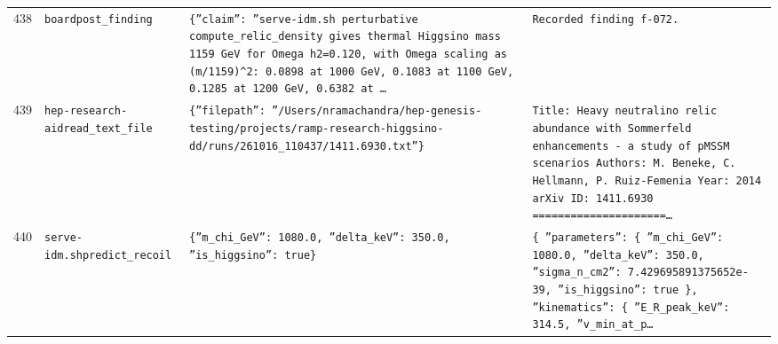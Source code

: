 \documentclass[11pt,a4paper]{article}
\begin{document}
\begin{longtable}{@{}p{}p{}p{}p{}@{}}
438 & \texttt{board}\newline\texttt{post\_\allowbreak{}finding} & \texttt{\{''claim'':\allowbreak{} ''serve-idm.sh perturbative compute\_\allowbreak{}relic\_\allowbreak{}density gives thermal Higgsino mass 1159 GeV for Omega h2=\allowbreak{}0.120,\allowbreak{} with Omega scaling as (m/\allowbreak{}1159)\allowbreak{}\textasciicircum{}\allowbreak{}2:\allowbreak{} 0.0898 at 1000 GeV,\allowbreak{} 0.1083 at 1100 GeV,\allowbreak{} 0.1285 at 1200 GeV,\allowbreak{} 0.6382 at \ldots{}\allowbreak{}} & \texttt{Recorded finding f-072.} \\
439 & \texttt{hep-research-aid}\newline\texttt{read\_\allowbreak{}text\_\allowbreak{}file} & \texttt{\{''filepath'':\allowbreak{} ''/\allowbreak{}Users/\allowbreak{}nramachandra/\allowbreak{}hep-genesis-testing/\allowbreak{}projects/\allowbreak{}ramp-research-higgsino-dd/\allowbreak{}runs/\allowbreak{}261016\_\allowbreak{}110437/\allowbreak{}1411.6930.txt''\}\allowbreak{}} & \texttt{Title:\allowbreak{} Heavy neutralino relic abundance with Sommerfeld enhancements - a study of pMSSM scenarios Authors:\allowbreak{} M. Beneke,\allowbreak{} C. Hellmann,\allowbreak{} P. Ruiz-Femenia Year:\allowbreak{} 2014 arXiv ID:\allowbreak{} 1411.6930  =\allowbreak{}=\allowbreak{}=\allowbreak{}=\allowbreak{}=\allowbreak{}=\allowbreak{}=\allowbreak{}=\allowbreak{}=\allowbreak{}=\allowbreak{}=\allowbreak{}=\allowbreak{}=\allowbreak{}=\allowbreak{}=\allowbreak{}=\allowbreak{}=\allowbreak{}=\allowbreak{}=\allowbreak{}=\allowbreak{}=\allowbreak{}\ldots{}\allowbreak{}} \\
440 & \texttt{serve-idm.sh}\newline\texttt{predict\_\allowbreak{}recoil} & \texttt{\{''m\_\allowbreak{}chi\_\allowbreak{}GeV'':\allowbreak{} 1080.0,\allowbreak{} ''delta\_\allowbreak{}keV'':\allowbreak{} 350.0,\allowbreak{} ''is\_\allowbreak{}higgsino'':\allowbreak{} true\}\allowbreak{}} & \texttt{\{   ''parameters'':\allowbreak{} \{     ''m\_\allowbreak{}chi\_\allowbreak{}GeV'':\allowbreak{} 1080.0,\allowbreak{}     ''delta\_\allowbreak{}keV'':\allowbreak{} 350.0,\allowbreak{}     ''sigma\_\allowbreak{}n\_\allowbreak{}cm2'':\allowbreak{} 7.429695891375652e-39,\allowbreak{}     ''is\_\allowbreak{}higgsino'':\allowbreak{} true   \}\allowbreak{},\allowbreak{}   ''kinematics'':\allowbreak{} \{     ''E\_\allowbreak{}R\_\allowbreak{}peak\_\allowbreak{}keV'':\allowbreak{} 314.5,\allowbreak{}     ''v\_\allowbreak{}min\_\allowbreak{}at\_\allowbreak{}p\ldots{}\allowbreak{}} \\

\end{longtable}
\end{document}
